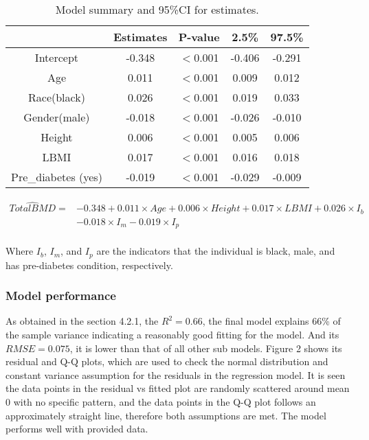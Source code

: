 \documentclass[11pt]{article}
\begin{document}
			
           \begin{table}[ht]
			\centering
\caption{Model summary and 95\%CI for estimates.\label{data3}}
\begin{tabular}{|c|c|c|c|c|}
				\hline
    & Estimates & P-value & 2.5\% & 97.5\% \\\hline 
Intercept & -0.348 & $<$0.001 & -0.406 & -0.291 \\\hline
Age & 0.011 & $<$0.001 & 0.009 & 0.012 \\\hline 
 Race(black) & 0.026 & $<$0.001 & 0.019 & 0.033 \\\hline 
 Gender(male) & -0.018 & $<$0.001 & -0.026 & -0.010 \\\hline 
 Height & 0.006 & $<$0.001 & 0.005 & 0.006 \\\hline 
 LBMI & 0.017 & $<$0.001 & 0.016 & 0.018 \\\hline 
 Pre\_diabetes (yes) & -0.019 & $<$0.001 & -0.029 & -0.009 \\\hline 
				\end{tabular}
			\end{table}	
			
\begin{equation}
\begin{split}
\hat{TotalBMD} = &-0.348 +0.011\times Age +0.006\times Height +0.017\times LBMI + 0.026\times I_b\\
&  -0.018\times I_m -0.019\times I_p \\
\end{split}
\end{equation}

Where $I_b$, $I_m$, and $I_p$ are the indicators that the individual is black, male, and has pre-diabetes condition, respectively.


\subsubsection {Model performance}
As obtained in the section 4.2.1, the $R^2=0.66$, the final model explains 66\% of the sample variance indicating a reasonably good fitting for the model. And its $RMSE =0.075$, it is lower than that of all other sub models. Figure 2 shows its residual and Q-Q plots, which are used to check the normal distribution and constant variance assumption for the residuals in the regression model. It is seen the data points in the residual vs fitted plot are randomly scattered around mean 0 with no specific pattern, and the data points in the Q-Q plot follows an approximately straight line, therefore both assumptions are met. The model performs well with provided data.
\end{document}
